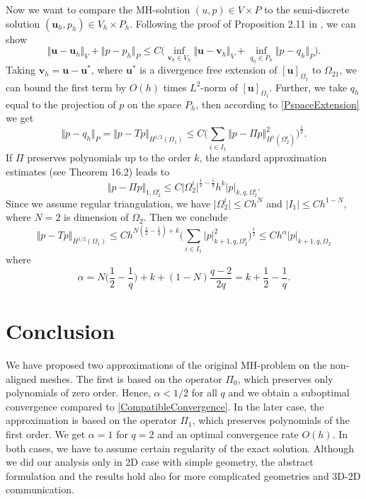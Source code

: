 \documentclass{elsart}
\def\vc#1{\mathbf{\boldsymbol{#1}}}     %
\def\abs#1{\lvert#1\rvert}
\def\norm#1{\bigl\Vert#1\bigr\Vert} %
\def\vl{{\vc{u}}}
\begin{document}
Now we want to compare the MH-solution $(u,p)\in V\times P$ to the semi-discrete solution $(\vl_h,p_h)\in V_h\times P_h$. Following the proof of Proposition 2.11 in \cite{Brezzi}, we can show
\begin{equation}\label{MainEst}
 	\norm{\vl-\vl_h}_V + \norm{p-p_h}_P \le C\big(
 		\inf_{\vc v_h \in V_h}\norm{\vl - \vc v_h}_{V} + \inf_{q_h\in P_h}\norm{p-q_h}_{P}
                \big).
\end{equation}
Taking $\vc v_h=\vl-\vl^*$, where $\vl^*$ is a divergence free extension of $[\vl]_{\Omega_1}$
to $\Omega_{21}$, we can bound the first term by $O(h)$ times $L^2$-norm of $[\vl]_{\Omega_1}$.
Further, we take $q_h$ equal to the projection of $p$ on the space $P_h$, then according to \eqref{PspaceExtension} we get
\[
  \norm{p-q_h}_{P} = \norm{p-T p}_{H^{1/2}(\Omega_1)}\le C\Big(\sum_{i\in I_1} \norm{p - \Pi p}_{H^1(\Omega_2^i)}^2\Big) ^\frac12.
\]
If $\Pi$ preserves polynomials up to the order $k$, the standard approximation estimates
(see \cite{FEMHandbook} Theorem 16.2) leads to
\[
 \norm{p-\Pi p}_{1,\Omega_2^i}\le C\abs{\Omega_2^i}^{\frac12-\frac1q} h^k \abs{p}_{k,q,\Omega_2^i}.
\]
Since we assume regular triangulation, we have $\abs{\Omega_2^i}\le C h^N$ and $\abs{I_1} \le C h^{1-N}$,
where $N=2$ is dimension of $\Omega_2$.
Then we conclude
\[
        \norm{p-Tp}_{H^{1/2}(\Omega_1)}\le C h^{N(\frac12-\frac1q)+k}\Big(\sum_{i\in I_1} \abs{p}_{k+1,q,\Omega_2^i}^2 \Big)^\frac12\le
        C h^\alpha \abs{p}_{k+1,q,\Omega_2}
\]
where 
\begin{equation}\label{ApproxOrder}
        \alpha= N\Big(\frac12-\frac1q\Big)+k+(1-N)\frac{q-2}{2q}=k+\frac{1}{2}-\frac{1}{q}.
\end{equation}

\section{Conclusion}
We have proposed two approximations of the original MH-problem on the non-aligned meshes. 
The first is based
on the operator $\Pi_0$, which preserves only polynomials of zero order. Hence, $\alpha<1/2$ for all $q$ and we obtain a suboptimal convergence compared to \eqref{CompatibleConvergence}. In the later case, the approximation is based on the operator
$\Pi_1$, which preserves polynomials of the first order. We get $\alpha=1$ for $q=2$ and an optimal  convergence rate $O(h)$.
In both cases, we have to assume certain regularity of the exact solution. Although we did our analysis
only in 2D case with simple geometry, the abstract formulation and the results hold also for more complicated geometries and 3D-2D communication. 
\end{document}
